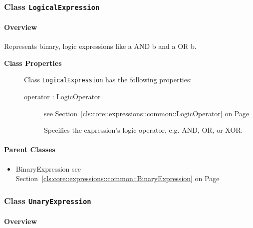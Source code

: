 \subsubsection{\Large{Class \bfseries \texttt{LogicalExpression}\normalfont}}
\label{cls:core::expressions::common::LogicalExpression} 
\paragraph{Overview}

	
			
Represents binary, logic expressions like a AND b and a OR b.	
		
	


\begin{description}

	\item[\textbf{Class Properties}] Class \texttt{LogicalExpression} has the following properties:
	\begin{description}
\item[operator : LogicOperator 	]
see Section~\ref{cls:core::expressions::common::LogicOperator} on Page~\pageref{cls:core::expressions::common::LogicOperator}
\hspace{\fill}
\nopagebreak


	
			
Specifies the expression's logic operator, e.g. AND, OR, or XOR.	
		
	
	\end{description}
	
	

\end{description}

\paragraph{Parent Classes}
\begin{itemize}
\item BinaryExpression see Section~\ref{cls:core::expressions::common::BinaryExpression} on Page~\pageref{cls:core::expressions::common::BinaryExpression}\end{itemize}
\subsubsection{\Large{Class \bfseries \texttt{UnaryExpression}\normalfont}}
\label{cls:core::expressions::common::UnaryExpression} 
\paragraph{Overview}

